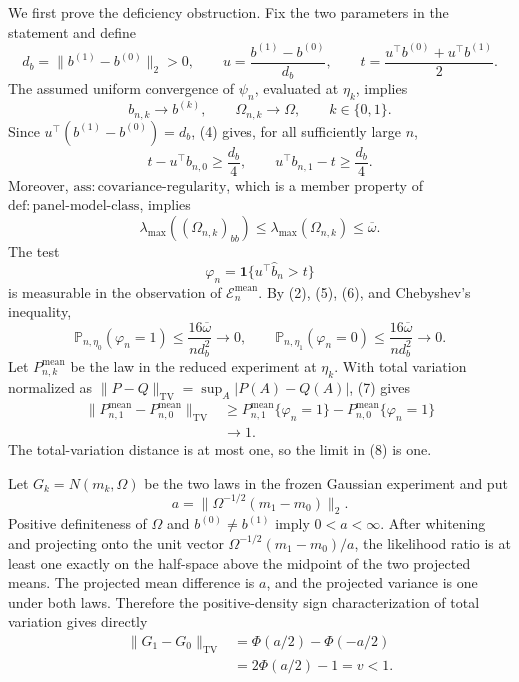 We first prove the deficiency obstruction. Fix the two parameters in the statement and define
\[
 d_b=\lVert b^{(1)}-b^{(0)}\rVert_2>0,
 \qquad
 u=\frac{b^{(1)}-b^{(0)}}{d_b},
 \qquad
 t=\frac{u^{\top}b^{(0)}+u^{\top}b^{(1)}}2.
 \tag{3}
\]
The assumed uniform convergence of \(\psi_n\), evaluated at \(\eta_k\), implies
\[
 b_{n,k}\longrightarrow b^{(k)},
 \qquad
 \Omega_{n,k}\longrightarrow\Omega,
 \qquad k\in\{0,1\}.
 \tag{4}
\]
Since \(u^{\top}(b^{(1)}-b^{(0)})=d_b\), (4) gives, for all sufficiently large \(n\),
\[
 t-u^{\top}b_{n,0}\geq\frac{d_b}{4},
 \qquad
 u^{\top}b_{n,1}-t\geq\frac{d_b}{4}.
 \tag{5}
\]
Moreover, \(\mathrm{ass:covariance\text{-}regularity}\), which is a member property of \(\mathrm{def:panel\text{-}model\text{-}class}\), implies
\[
 \lambda_{\max}((\Omega_{n,k})_{bb})
 \leq\lambda_{\max}(\Omega_{n,k})
 \leq\overline\omega.
 \tag{6}
\]
The test
\[
 \varphi_n=\mathbf 1\{u^{\top}\widehat b_n>t\}
\]
is measurable in the observation of \(\mathcal E_n^{\mathrm{mean}}\). By (2), (5), (6), and Chebyshev's inequality,
\[
 \mathbb P_{n,\eta_0}(\varphi_n=1)
 \leq\frac{16\overline\omega}{n d_b^2}\longrightarrow0,
 \qquad
 \mathbb P_{n,\eta_1}(\varphi_n=0)
 \leq\frac{16\overline\omega}{n d_b^2}\longrightarrow0.
 \tag{7}
\]
Let \(P^{\mathrm{mean}}_{n,k}\) be the law in the reduced experiment at \(\eta_k\). With total variation normalized as \(\lVert P-Q\rVert_{\mathrm{TV}}=\sup_A|P(A)-Q(A)|\), (7) gives
\[
 \begin{aligned}
 \lVert P^{\mathrm{mean}}_{n,1}-P^{\mathrm{mean}}_{n,0}\rVert_{\mathrm{TV}}
 &\geq
 P^{\mathrm{mean}}_{n,1}\{\varphi_n=1\}
 -P^{\mathrm{mean}}_{n,0}\{\varphi_n=1\}\\
 &\longrightarrow1.
 \end{aligned}
 \tag{8}
\]
The total-variation distance is at most one, so the limit in (8) is one.

Let \(G_k=N(m_k,\Omega)\) be the two laws in the frozen Gaussian experiment and put
\[
 a=\lVert\Omega^{-1/2}(m_1-m_0)\rVert_2.
\]
Positive definiteness of \(\Omega\) and \(b^{(0)}\ne b^{(1)}\) imply \(0<a<\infty\). After whitening and projecting onto the unit vector \(\Omega^{-1/2}(m_1-m_0)/a\), the likelihood ratio is at least one exactly on the half-space above the midpoint of the two projected means. The projected mean difference is \(a\), and the projected variance is one under both laws. Therefore the positive-density sign characterization of total variation gives directly
\[
 \begin{aligned}
 \lVert G_1-G_0\rVert_{\mathrm{TV}}
 &=\Phi(a/2)-\Phi(-a/2)\\
 &=2\Phi(a/2)-1
 =v<1.
 \end{aligned}
 \tag{9}
\]

